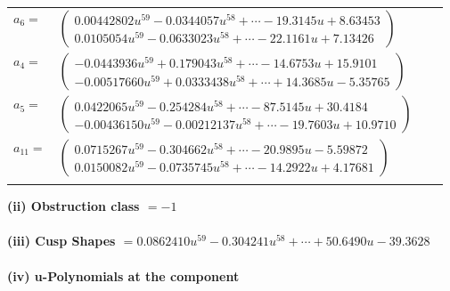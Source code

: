 \documentclass[1p]{elsarticle_modified}
\theoremstyle{definition}
\begin{document}
\begin{tabular}{m{7pt} m{180pt} m{7pt} m{180pt} }
\flushright $a_{6}=$&$\begin{pmatrix}0.00442802 u^{59}-0.0344057 u^{58}+\cdots-19.3145 u+8.63453\\0.0105054 u^{59}-0.0633023 u^{58}+\cdots-22.1161 u+7.13426\end{pmatrix}$ \\
\flushright $a_{4}=$&$\begin{pmatrix}-0.0443936 u^{59}+0.179043 u^{58}+\cdots-14.6753 u+15.9101\\-0.00517660 u^{59}+0.0333438 u^{58}+\cdots+14.3685 u-5.35765\end{pmatrix}$ \\
\flushright $a_{5}=$&$\begin{pmatrix}0.0422065 u^{59}-0.254284 u^{58}+\cdots-87.5145 u+30.4184\\-0.00436150 u^{59}-0.00212137 u^{58}+\cdots-19.7603 u+10.9710\end{pmatrix}$ \\
\flushright $a_{11}=$&$\begin{pmatrix}0.0715267 u^{59}-0.304662 u^{58}+\cdots-20.9895 u-5.59872\\0.0150082 u^{59}-0.0735745 u^{58}+\cdots-14.2922 u+4.17681\end{pmatrix}$\\&\end{tabular}
\flushleft \textbf{(ii) Obstruction class $= -1$}\\~\\
\flushleft \textbf{(iii) Cusp Shapes $= 0.0862410 u^{59}-0.304241 u^{58}+\cdots+50.6490 u-39.3628$}\\~\\
\newpage\renewcommand{\arraystretch}{1}
\flushleft \textbf{(iv) u-Polynomials at the component}\newline \\
\end{document}
